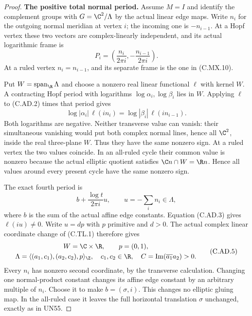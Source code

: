 \begin{proof}
\par\medskip\noindent\textbf{The positive total normal period.}
Assume $M=I$ and identify the complement groups with
$G=\C^2/\Lambda$ by the actual linear edge maps. Write $n_i$
for the outgoing normal meridian at vertex $i$; the incoming
one is $-n_{i-1}$. At a Hopf vertex these two vectors are
complex-linearly independent, and its actual logarithmic frame is
\[
       P_i=\left(\frac{n_i}{2\pi i},
                         -\frac{n_{i-1}}{2\pi i}\right).
                                                        \tag{C.AD.2}
\]
At a ruled vertex $n_i=n_{i-1}$, and its separate frame is the
one in (C.MX.10).

Put $W=\operatorname{span}_{\R}\Lambda$ and choose a nonzero
real linear functional $\ell$ with kernel $W$. A contracting
Hopf period with logarithms $\log\alpha_i,\log\beta_i$ lies
in $W$. Applying $\ell$ to (C.AD.2) times that period gives
\[
 \log|\alpha_i|\,\ell(i n_i)
       =\log|\beta_i|\,\ell(i n_{i-1}).                 \tag{C.AD.3}
\]
Both logarithms are negative. Neither transverse value can
vanish: their simultaneous vanishing would put both complex
normal lines, hence all $\C^2$, inside the real three-plane
$W$. Thus they have the same nonzero sign. At a ruled vertex
the two values coincide. In an all-ruled cycle their common
value is nonzero because the actual elliptic quotient satisfies
$\C n\cap W=\R n$. Hence all values around every present
cycle have the same nonzero sign.

The exact fourth period is
\[
 b+\frac{\log t}{2\pi i}u,\qquad
             u=-\sum_i n_i\in\Lambda,
                                                        \tag{C.AD.4}
\]
where $b$ is the sum of the actual affine edge constants.
Equation (C.AD.3) gives $\ell(iu)\ne0$. Write $u=d p$ with
$p$ primitive and $d>0$. The actual complex linear coordinate
change of (C.TL.1) therefore gives
\[
 \begin{gathered}
 W=\C\times\R,\qquad p=(0,1),\\
 \Lambda=\langle (a_1,c_1),(a_2,c_2),p\rangle_{\Z},
 \quad c_1,c_2\in\R,\quad
 C=\operatorname{Im}(\overline{a_1}a_2)>0.
 \end{gathered}                                        \tag{C.AD.5}
\]
Every $n_i$ has nonzero second coordinate, by the transverse
calculation. Changing one normal-product constant changes
its affine edge constant by an arbitrary multiple of $n_i$.
Choose it to make $b=(\sigma,i)$. This changes no elliptic
gluing map. In the all-ruled case it leaves the full horizontal
translation $\sigma$ unchanged, exactly as in UN55.


\end{proof}
